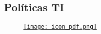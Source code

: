 

\subsection{Políticas TI}
    \begin{figure}[!ht]
        \centering
        \href{https://klintex.com.pe/wp-content/uploads/2021/12/Politica-Privacidad_-Klintex.pdf}{
                \texttt{[image: icon\_pdf.png]}
                }
    \end{figure}    

